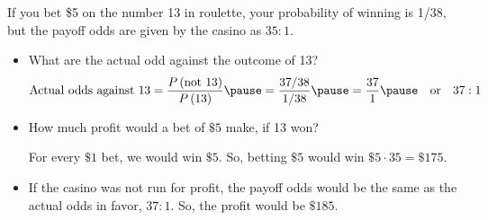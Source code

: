 \documentclass{beamer}
\newcommand{\prob}[1]{P\left(#1\right)}
\begin{document}
\begin{frame}
\begin{example}
If you bet \$5 on the number 13 in roulette, your probability of winning is 1/38, but the payoff odds are given by the casino as $35:1$.\pause

\begin{itemize}
\item What are the actual odd against the outcome of 13?\pause
\begin{equation*}
\text{Actual odds against 13} = \dfrac{\prob{\text{not 13}}}{\prob{13}}\pause
= \dfrac{37/38}{1/38}\pause
= \dfrac{37}{1}\pause
\quad\text{or}\quad 37:1
\end{equation*}\pause
\item How much profit would a bet of $\$5$ make, if 13 won?\pause

\vspace{2mm}
For every $\$1$ bet, we would win $\$5$. So, betting $\$5$ would win $\$5\cdot 35 = \$175$.\pause\vspace{3mm}
\item If the casino was not run for profit, the payoff odds would be the same as the actual odds in favor, $37:1$. So, the profit would be $\$185$.
\end{itemize}
\end{example}
\end{frame}
\end{document}
